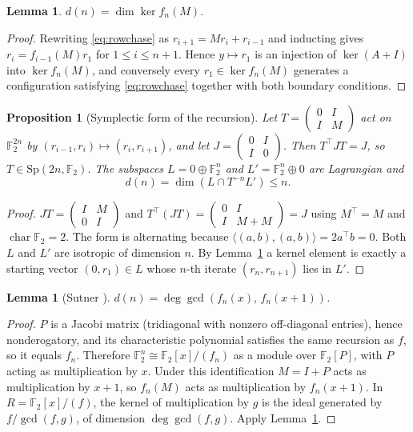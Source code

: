 \documentclass[a4paper]{article}
\newtheorem{lemma}[theorem]{Lemma}
\newtheorem{proposition}[theorem]{Proposition}
\theoremstyle{definition}
\newcommand{\F}{\mathbb{F}}
\begin{document}
	\begin{lemma}\label{lem:rowchase}
		$d(n) = \dim \ker f_n(M)$.
	\end{lemma}
	\begin{proof}
		Rewriting \eqref{eq:rowchase} as $r_{i+1} = M r_i + r_{i-1}$ and inducting gives $r_i = f_{i-1}(M) r_1$ for $1 \le i \le n+1$.
		Hence $y \mapsto r_1$ is an injection of $\ker(A+I)$ into $\ker f_n(M)$, and conversely every $r_1 \in \ker f_n(M)$ generates a configuration satisfying \eqref{eq:rowchase} together with both boundary conditions.
	\end{proof}

	\begin{proposition}[Symplectic form of the recursion]\label{prop:symplectic}
		Let $T = \begin{pmatrix} 0 & I \\ I & M\end{pmatrix}$ act on $\F_2^{2n}$ by $(r_{i-1}, r_i) \mapsto (r_i, r_{i+1})$, and let $J = \begin{pmatrix}0 & I \\ I & 0\end{pmatrix}$.
		Then $T^\intercal J T = J$, so $T \in \mathrm{Sp}(2n, \F_2)$.
		The subspaces $L = 0 \oplus \F_2^n$ and $L' = \F_2^n \oplus 0$ are Lagrangian and
		\begin{equation*}
			d(n) = \dim \left( L \cap T^{-n} L' \right) \leq n .
		\end{equation*}
	\end{proposition}
	\begin{proof}
		$JT = \begin{pmatrix} I & M \\ 0 & I \end{pmatrix}$ and $T^\intercal(JT) = \begin{pmatrix} 0 & I \\ I & M + M\end{pmatrix} = J$ using $M^\intercal = M$ and $\operatorname{char} \F_2 = 2$.
		The form is alternating because $\langle (a,b), (a,b)\rangle = 2 a^\intercal b = 0$.
		Both $L$ and $L'$ are isotropic of dimension $n$.
		By Lemma~\ref{lem:rowchase} a kernel element is exactly a starting vector $(0, r_1) \in L$ whose $n$-th iterate $(r_n, r_{n+1})$ lies in $L'$.
	\end{proof}

	\begin{lemma}[Sutner \cite{Sutner96sigma-automataand}]\label{lem:sutner}
		$d(n) = \deg \gcd\left(f_n(x),\, f_n(x+1)\right)$.
	\end{lemma}
	\begin{proof}
		$P$ is a Jacobi matrix (tridiagonal with nonzero off-diagonal entries), hence nonderogatory, and its characteristic polynomial satisfies the same recursion as $f$, so it equals $f_n$.
		Therefore $\F_2^n \cong \F_2[x]/(f_n)$ as a module over $\F_2[P]$, with $P$ acting as multiplication by $x$.
		Under this identification $M = I + P$ acts as multiplication by $x + 1$, so $f_n(M)$ acts as multiplication by $f_n(x+1)$.
		In $R = \F_2[x]/(f)$, the kernel of multiplication by $g$ is the ideal generated by $f/\gcd(f,g)$, of dimension $\deg\gcd(f,g)$.
		Apply Lemma~\ref{lem:rowchase}.
	\end{proof}
\end{document}
